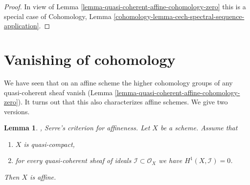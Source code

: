 \documentclass{stacks-project}
\newenvironment{reference}{\comment}{\endcomment}
\newenvironment{slogan}{\comment}{\endcomment}
\theoremstyle{plain}
\newtheorem{lemma}[subsection]{Lemma}
\theoremstyle{definition}
\theoremstyle{remark}
\numberwithin{equation}{subsection}
\begin{document}
\begin{proof}
In view of
Lemma \ref{lemma-quasi-coherent-affine-cohomology-zero}
this is a special case of
Cohomology, Lemma
\ref{cohomology-lemma-cech-spectral-sequence-application}.
\end{proof}







\section{Vanishing of cohomology}
\label{section-vanishing}

\noindent
We have seen that on an affine scheme the higher cohomology groups
of any quasi-coherent sheaf vanish
(Lemma \ref{lemma-quasi-coherent-affine-cohomology-zero}).
It turns out that this also
characterizes affine schemes. We give two versions.

\begin{lemma}
\label{lemma-quasi-compact-h1-zero-covering}
\begin{reference}
\cite{Serre-criterion}, \cite[II, Theorem 5.2.1 (d') and IV (1.7.17)]{EGA}
\end{reference}
\begin{slogan}
Serre's criterion for affineness.
\end{slogan}
Let $X$ be a scheme.
Assume that
\begin{enumerate}
\item $X$ is quasi-compact,
\item for every quasi-coherent sheaf of ideals
$\mathcal{I} \subset \mathcal{O}_X$ we have $H^1(X, \mathcal{I}) = 0$.
\end{enumerate}
Then $X$ is affine.
\end{lemma}
\end{document}
